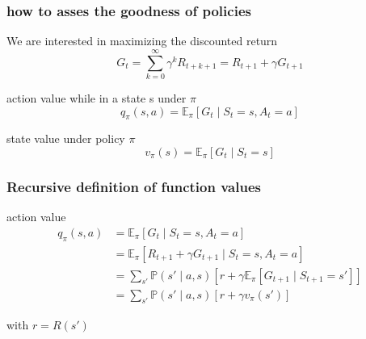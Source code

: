 \documentclass[dvipsnames,svgnames]{beamer}
\begin{document}
\begin{frame}
\frametitle{how to asses the goodness of policies}
\begin{block}{We are interested in maximizing the discounted return}
$$ G_t= \sum_{k=0}^{\infty}\gamma^k R_{t+k+1} = R_{t+1} + \gamma G_{t+1}$$
\end{block}

\pause
\begin{block}{action value while in a state s under $\pi$}
\begin{equation}
q_{\pi}(s,a) = \mathbb{E}_{\pi}[G_t\mid S_t =s,A_t=a]
\end{equation}
\end{block}

\pause
\begin{block}{state value under policy $\pi$}
\begin{equation}
v_{\pi}(s)=\mathbb{E}_{\pi}[G_t \mid S_t=s]
\end{equation}
\end{block}



\end{frame}

\begin{frame}
\frametitle{Recursive definition of function values}
\begin{block}{action value}
\begin{equation}
\begin{split}
q_{\pi}(s,a) &= \mathbb{E}_{\pi}[G_t\mid S_t =s, A_t=a]
\\&=\mathbb{E}_{\pi}[R_{t+1}+\gamma G_{t+1}\mid S_t =s, A_t=a]
\\& =\sum_{s'}\mathbb{P}(s'\mid a,s)\left[r + \gamma \mathbb{E}_{\pi}\left[G_{t+1} \mid S_{t+1}=s' \right]\right]
\\& = \sum_{s'}\mathbb{P}(s'\mid a,s)\left[r + \gamma v_{\pi}(s') \right]
\end{split}
\end{equation}
\end{block}

with $r=R(s')$
\end{frame}
\end{document}
